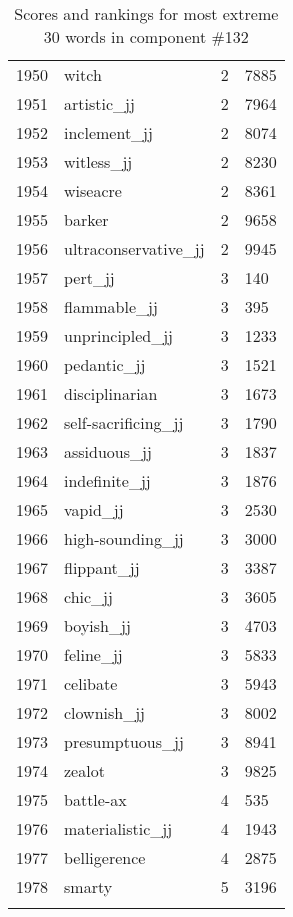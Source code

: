\begin{longtable}[!htbp]{| rlr@{.}l |}
    1950 & witch & 2 & 7885 \\
    1951 & artistic\_jj & 2 & 7964 \\
    1952 & inclement\_jj & 2 & 8074 \\
    1953 & witless\_jj & 2 & 8230 \\
    1954 & wiseacre & 2 & 8361 \\
    1955 & barker & 2 & 9658 \\
    1956 & ultraconservative\_jj & 2 & 9945 \\
    1957 & pert\_jj & 3 & 140 \\
    1958 & flammable\_jj & 3 & 395 \\
    1959 & unprincipled\_jj & 3 & 1233 \\
    1960 & pedantic\_jj & 3 & 1521 \\
    1961 & disciplinarian & 3 & 1673 \\
    1962 & self-sacrificing\_jj & 3 & 1790 \\
    1963 & assiduous\_jj & 3 & 1837 \\
    1964 & indefinite\_jj & 3 & 1876 \\
    1965 & vapid\_jj & 3 & 2530 \\
    1966 & high-sounding\_jj & 3 & 3000 \\
    1967 & flippant\_jj & 3 & 3387 \\
    1968 & chic\_jj & 3 & 3605 \\
    1969 & boyish\_jj & 3 & 4703 \\
    1970 & feline\_jj & 3 & 5833 \\
    1971 & celibate & 3 & 5943 \\
    1972 & clownish\_jj & 3 & 8002 \\
    1973 & presumptuous\_jj & 3 & 8941 \\
    1974 & zealot & 3 & 9825 \\
    1975 & battle-ax & 4 & 535 \\
    1976 & materialistic\_jj & 4 & 1943 \\
    1977 & belligerence & 4 & 2875 \\
    1978 & smarty & 5 & 3196 \\
    \hline
    \caption{Scores and rankings for most extreme 30 words in component \#132} \\
\end{longtable}
